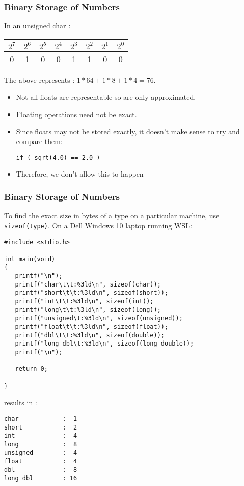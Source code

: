 \begin{frame}[fragile]
\frametitle{Binary Storage of Numbers}

In an unsigned char :

\begin{center}
\begin{tabular}{|c|c|c|c|c|c|c|c|}\hline
$2^7$ & $2^6$ & $2^5$ & $2^4$ & $2^3$ & $2^2$ & $2^1$ & $2^0$ \\ \hline
0     & 1     & 0     & 0     & 1     & 1     & 0     & 0     \\ \hline
\end{tabular}
\end{center}

The above represents : $1 * 64 + 1 * 8 + 1 * 4 = 76$.

\begin{itemize}[<+->]
\item Not all floats are representable so are only approximated.
\item Floating operations need not be exact.
\item Since floats may not be stored exactly, it doesn't make sense to try and compare them:
\begin{lstlisting}[style=basicc,numbers=none]
if ( sqrt(4.0) == 2.0 )
\end{lstlisting}
\item Therefore, we don't allow this to happen
\end{itemize}
\end{frame}


\begin{frame}[fragile]
\frametitle{Binary Storage of Numbers}

To find the exact size in bytes of a type on a particular machine,
use {\tt sizeof(type)}. On a Dell Windows 10 laptop running WSL:
{\small
\begin{verbatim}
#include <stdio.h>

int main(void)
{
   printf("\n");
   printf("char\t\t:%3ld\n", sizeof(char));
   printf("short\t\t:%3ld\n", sizeof(short));
   printf("int\t\t:%3ld\n", sizeof(int));
   printf("long\t\t:%3ld\n", sizeof(long));
   printf("unsigned\t:%3ld\n", sizeof(unsigned));
   printf("float\t\t:%3ld\n", sizeof(float));
   printf("dbl\t\t:%3ld\n", sizeof(double));
   printf("long dbl\t:%3ld\n", sizeof(long double));
   printf("\n");

   return 0;

}
\end{verbatim}
}

results in :
{\small
\begin{verbatim}
char            :  1
short           :  2
int             :  4
long            :  8
unsigned        :  4
float           :  4
dbl             :  8
long dbl        : 16
\end{verbatim}
}
\end{frame}
\endinput

